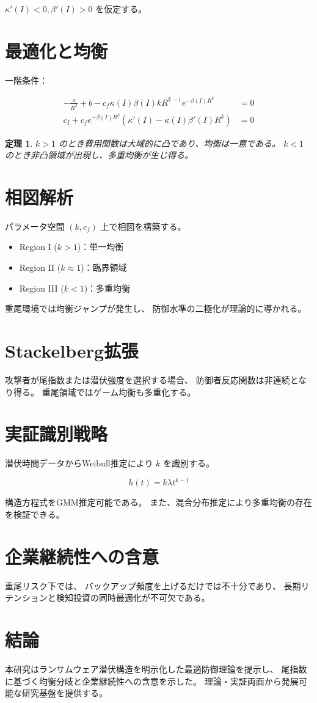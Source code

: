 \documentclass[12pt,a4paper]{article}
\newtheorem{theorem}{定理}
\begin{document}
$\kappa'(I)<0, \beta'(I)>0$ を仮定する。

\section{最適化と均衡}

一階条件：

\begin{align}
-\frac{a}{R^2}
+ b
- c_f \kappa(I)\beta(I)kR^{k-1}e^{-\beta(I)R^k}
&=0 \\
c_I
+ c_f e^{-\beta(I)R^k}
(\kappa'(I)-\kappa(I)\beta'(I)R^k)
&=0
\end{align}

\begin{theorem}
$k>1$ のとき費用関数は大域的に凸であり、均衡は一意である。
$k<1$ のとき非凸領域が出現し、多重均衡が生じ得る。
\end{theorem}

\section{相図解析}

パラメータ空間 $(k, c_f)$ 上で相図を構築する。

\begin{itemize}
\item Region I ($k>1$)：単一均衡
\item Region II ($k\approx1$)：臨界領域
\item Region III ($k<1$)：多重均衡
\end{itemize}

重尾環境では均衡ジャンプが発生し、
防御水準の二極化が理論的に導かれる。

\section{Stackelberg拡張}

攻撃者が尾指数または潜伏強度を選択する場合、
防御者反応関数は非連続となり得る。
重尾領域ではゲーム均衡も多重化する。

\section{実証識別戦略}

潜伏時間データからWeibull推定により $k$ を識別する。

\begin{equation}
h(t)=k\lambda t^{k-1}
\end{equation}

構造方程式をGMM推定可能である。
また、混合分布推定により多重均衡の存在を検証できる。

\section{企業継続性への含意}

重尾リスク下では、
バックアップ頻度を上げるだけでは不十分であり、
長期リテンションと検知投資の同時最適化が不可欠である。

\section{結論}

本研究はランサムウェア潜伏構造を明示化した最適防御理論を提示し、
尾指数に基づく均衡分岐と企業継続性への含意を示した。
理論・実証両面から発展可能な研究基盤を提供する。
\end{document}
